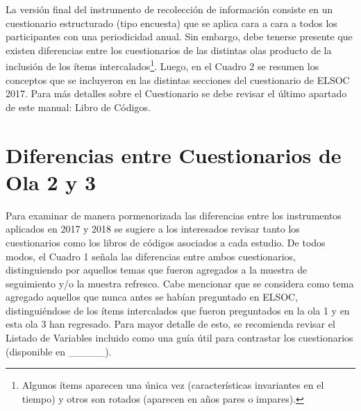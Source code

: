 \documentclass[
  openany]{book}
\begin{document}
La versión final del instrumento de recolección de información consiste en un cuestionario estructurado (tipo encuesta) que se aplica cara a cara a todos los participantes con una periodicidad anual. Sin embargo, debe tenerse presente que existen diferencias entre los cuestionarios de las distintas olas producto de la inclusión de los ítems intercalados\footnote{Algunos ítems aparecen una única vez (características invariantes en el tiempo) y otros son rotados (aparecen en años pares o impares).}. Luego, en el Cuadro 2 se resumen los conceptos que se incluyeron en las distintas secciones del cuestionario de ELSOC 2017. Para más detalles sobre el Cuestionario se debe revisar el último apartado de este manual: Libro de Códigos.

\hypertarget{dif-cuest}{%
\section{Diferencias entre Cuestionarios de Ola 2 y 3}\label{dif-cuest}}

Para examinar de manera pormenorizada las diferencias entre los instrumentos aplicados en 2017 y 2018 se sugiere a los interesados revisar tanto los cuestionarios como los libros de códigos asociados a cada estudio. De todos modos, el Cuadro 1 señala las diferencias entre ambos cuestionarios, distinguiendo por aquellos temas que fueron agregados a la muestra de seguimiento y/o la muestra refresco. Cabe mencionar que se considera como tema agregado aquellos que nunca antes se habían preguntado en ELSOC, distinguiéndose de los ítems intercalados que fueron preguntados en la ola 1 y en esta ola 3 han regresado. Para mayor detalle de esto, se recomienda revisar el Listado de Variables incluido como una guía útil para contrastar los cuestionarios (disponible en \_\_\_\_\_).
\end{document}
